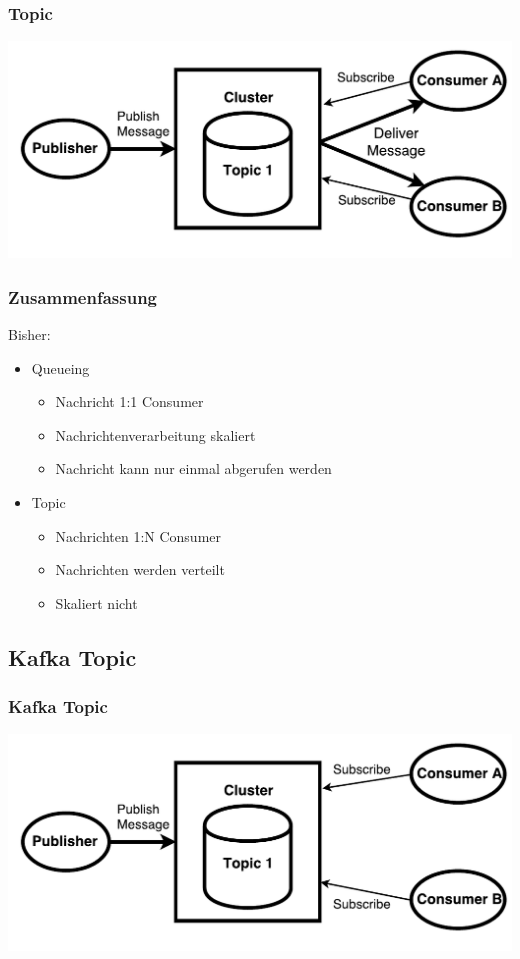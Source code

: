\begin{frame}
\frametitle{Topic}
	\centering
	\includegraphics[scale=0.6]{figure/topic_draw.pdf}
\end{frame}

\begin{frame}
\frametitle{Zusammenfassung}

Bisher: 
\begin{itemize}
	\item Queueing
	\begin{itemize}
		\item Nachricht 1:1 Consumer
		\item Nachrichtenverarbeitung skaliert
		\item Nachricht kann nur einmal abgerufen werden
	\end{itemize}
	\item Topic
	\begin{itemize}
		\item Nachrichten 1:N Consumer
		\item Nachrichten werden verteilt
		\item Skaliert nicht  			%
	\end{itemize}
\end{itemize}
\end{frame}

\subsection{Kafka Topic}
\begin{frame}
\frametitle{Kafka Topic}
\centering
\includegraphics[scale=0.6]{figure/Kafka_topic_draw_subscribe.pdf}
\end{frame}

